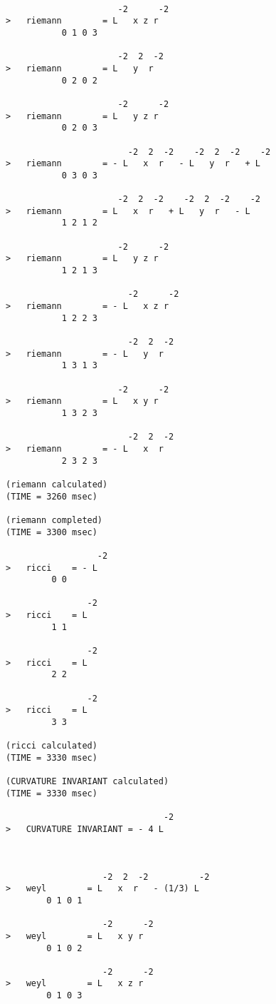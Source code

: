\begin{verbatim}

                      -2      -2
>   riemann        = L   x z r
           0 1 0 3

                      -2  2  -2
>   riemann        = L   y  r
           0 2 0 2

                      -2      -2
>   riemann        = L   y z r
           0 2 0 3

                        -2  2  -2    -2  2  -2    -2
>   riemann        = - L   x  r   - L   y  r   + L
           0 3 0 3

                      -2  2  -2    -2  2  -2    -2
>   riemann        = L   x  r   + L   y  r   - L
           1 2 1 2

                      -2      -2
>   riemann        = L   y z r
           1 2 1 3

                        -2      -2
>   riemann        = - L   x z r
           1 2 2 3

                        -2  2  -2
>   riemann        = - L   y  r
           1 3 1 3

                      -2      -2
>   riemann        = L   x y r
           1 3 2 3

                        -2  2  -2
>   riemann        = - L   x  r
           2 3 2 3

(riemann calculated)
(TIME = 3260 msec)

(riemann completed)
(TIME = 3300 msec)

                  -2
>   ricci    = - L
         0 0

                -2
>   ricci    = L
         1 1

                -2
>   ricci    = L
         2 2

                -2
>   ricci    = L
         3 3

(ricci calculated)
(TIME = 3330 msec)

(CURVATURE INVARIANT calculated)
(TIME = 3330 msec)

                               -2
>   CURVATURE INVARIANT = - 4 L



                   -2  2  -2          -2
>   weyl        = L   x  r   - (1/3) L
        0 1 0 1

                   -2      -2
>   weyl        = L   x y r
        0 1 0 2

                   -2      -2
>   weyl        = L   x z r
        0 1 0 3


\end{verbatim}
